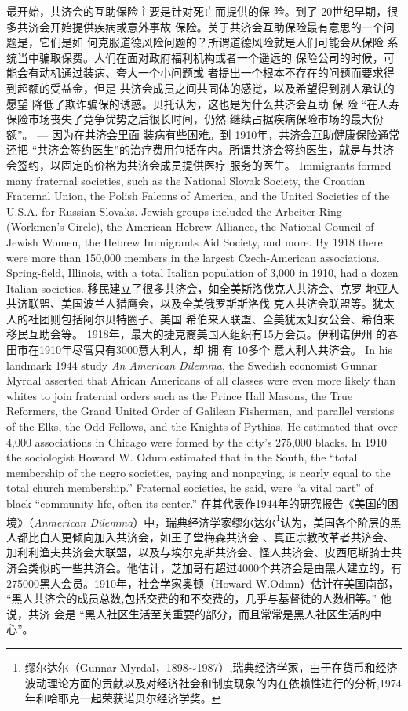 \begin{paracol}{2}
\switchcolumn
最开始，共济会的互助保险主要是针对死亡而提供的保
险。到了 20世纪早期，很多共济会开始提供疾病或意外事故
保险。关于共济会互助保险最有意思的一个问题是，它们是如
何克服道德风险问题的？所谓道德风险就是人们可能会从保险
系统当中骗取保费。人们在面对政府福利机构或者一个遥远的
保险公司的时候，可能会有动机通过装病、夸大一个小问题或
者提出一个根本不存在的问题而要求得到超额的受益金，但是
共济会成员之间共同体的感觉，以及希望得到别人承认的愿望
降低了欺诈骗保的诱惑。贝托认为，这也是为什么共济会互助
保 险 “在人寿保险市场丧失了竞争优势之后很长时间，仍然
继续占据疾病保险市场的最大份额”。 --- 因为在共济会里面
装病有些困难。到 1910年，共济会互助健康保险通常还把
“共济会签约医生”的治疗费用包括在内。所谓共济会签约医生，就是与共济会签约，以固定的价格为共济会成员提供医疗
服务的医生。
\switchcolumn*
Immigrants formed many fraternal societies, such as the National Slovak Society, the Croatian Fraternal Union, the Polish
Falcons of America, and the United Societies of the U.S.A. for
Russian Slovaks. Jewish groups included the Arbeiter Ring
(Workmen's Circle), the American-Hebrew Alliance, the National Council of Jewish Women, the Hebrew Immigrants Aid
Society, and more. By 1918 there were more than 150,000
members in the largest Czech-American associations. Spring-field, Illinois, with a total Italian population of 3,000 in 1910,
had a dozen Italian societies.
\switchcolumn
移民建立了很多共济会，如全美斯洛伐克人共济会、克罗
地亚人共济联盟、美国波兰人猎鹰会，以及全美俄罗斯斯洛伐
克人共济会联盟等。犹太人的社团则包括阿尔贝特圈子、美国
希伯来人联盟、全美犹太妇女公会、希伯来移民互助会等。
1918年，最大的捷克裔美国人组织有15万会员。伊利诺伊州
的春田市在1910年尽管只有3000意大利人，却 拥 有 10多个
意大利人共济会。
\switchcolumn*
In his landmark 1944 study \textit{An American Dilemma}, the
Swedish economist Gunnar Myrdal asserted that African Americans of all classes were even more likely than whites to join fraternal orders such as the Prince Hall Masons, the True
Reformers, the Grand United Order of Galilean Fishermen, and
parallel versions of the Elks, the Odd Fellows, and the Knights
of Pythias. He estimated that over 4,000 associations in
Chicago were formed by the city's 275,000 blacks. In 1910 the
sociologist Howard W. Odum estimated that in the South, the
``total membership of the negro societies, paying and nonpaying, is nearly equal to the total church membership.'' Fraternal
societies, he said, were ``a vital part'' of black ``community life,
often its center.''
\switchcolumn
在其代表作1944年的研究报告《美国的困境》（\textit{Anmerican Dilemma}）中，瑞典经济学家缪尔达尔\footnote{缪尔达尔（Gunnar Myrdal，1898$\sim$1987）,瑞典经济学家，由于在货币和经济波动理论方面的贡献以及对经济社会和制度现象的内在依赖性进行的分析,1974年和哈耶克一起荣获诺贝尔经济学奖。}认为，美国各个阶层的黑人都比白人更倾向加入共济会，如王子堂梅森共济会 、真正宗教改革者共济会、加利利渔夫共济会大联盟，以及与埃尔克斯共济会、怪人共济会、皮西厄斯骑士共济会类似的一些共济会。他估计，芝加哥有超过4000个共济会是由黑人建立的，有 275000黑人会员。1910年，社会学家奥顿（How­ard W.Odmn）估计在美国南部， “黑人共济会的成员总数,包括交费的和不交费的，几乎与基督徒的人数相等。” 他说，共济 会是 “黑人社区生活至关重要的部分，而且常常是黑人社区生活的中心”。

\end{paracol}
